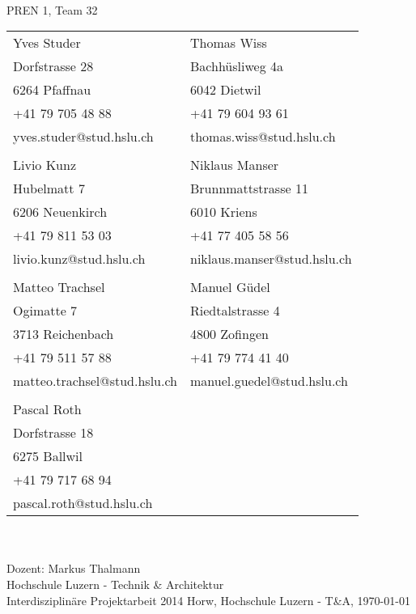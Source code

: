 \begin{titlepage}
    \begin{center}
        \parindent0pt{\Huge\bfseries \myDokumentTyp}\\[0.5cm]
		{\huge PREN 1, Team 32}\\[2em]
        \begin{tabular}{ll}
            Yves Studer                & Thomas Wiss \\
            Dorfstrasse 28             & Bachhüsliweg 4a \\
            6264 Pfaffnau              & 6042 Dietwil \\
            +41 79 705 48 88           & +41 79 604 93 61 \\
            yves.studer@stud.hslu.ch   & thomas.wiss@stud.hslu.ch \\
                                       & \\
            Livio Kunz                 & Niklaus Manser \\
            Hubelmatt 7                & Brunnmattstrasse 11\\
            6206 Neuenkirch            & 6010 Kriens \\
            +41 79 811 53 03           & +41 77 405 58 56 \\
            livio.kunz@stud.hslu.ch    & niklaus.manser@stud.hslu.ch \\
                                       & \\
            Matteo Trachsel			   & Manuel Güdel \\
            Ogimatte 7                 & Riedtalstrasse 4\\
            3713 Reichenbach           & 4800 Zofingen\\
            +41 79 511 57 88           & +41 79 774 41 40 \\
            matteo.trachsel@stud.hslu.ch & manuel.guedel@stud.hslu.ch \\
            						   & \\
            Pascal Roth			       & \\
            Dorfstrasse 18			   & \\
            6275 Ballwil		       & \\
            +41 79 717 68 94	       & \\
            pascal.roth@stud.hslu.ch   & \\
        \end{tabular}\\
        \vspace{3em}
        {\Huge \myTitel}\\[5em]
        Dozent: Markus Thalmann\\[2em]
        Hochschule Luzern - Technik \& Architektur\\   
        Interdisziplinäre Projektarbeit 2014
        \vfill{}
        Horw, Hochschule Luzern - T\&A, \today
    \end{center}
\end{titlepage}
